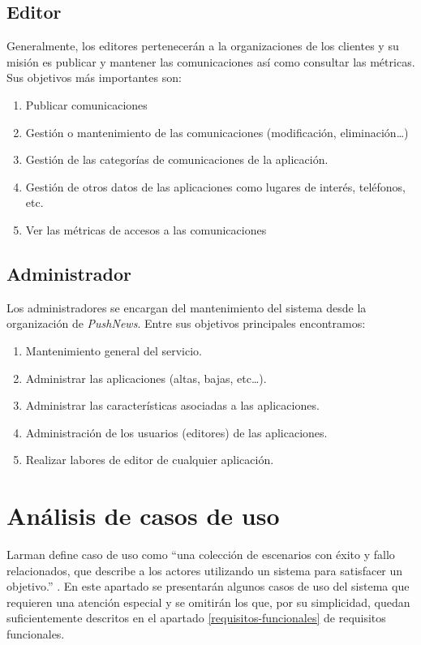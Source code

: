 \subsection{Editor}
Generalmente, los editores pertenecerán a la organizaciones de los clientes y su misión es publicar y mantener las comunicaciones así como consultar las métricas. Sus objetivos más importantes son:
\begin{enumerate}
    \item Publicar comunicaciones
    \item Gestión o mantenimiento de las comunicaciones (modificación, eliminación\dots)
    \item Gestión de las categorías de comunicaciones de la aplicación.
    \item Gestión de otros datos de las aplicaciones como lugares de interés, teléfonos, etc.
    \item Ver las métricas de accesos a las comunicaciones
\end{enumerate}

\subsection{Administrador}
Los administradores se encargan del mantenimiento del sistema desde la organización de \emph{PushNews}. Entre sus objetivos principales encontramos:
\begin{enumerate}
    \item Mantenimiento general del servicio.
    \item Administrar las aplicaciones (altas, bajas, etc\dots).
    \item Administrar las características asociadas a las aplicaciones.
    \item Administración de los usuarios (editores) de las aplicaciones. 
    \item Realizar labores de editor de cualquier aplicación.
\end{enumerate}

\section{Análisis de casos de uso}
Larman define caso de uso como ``una colección de escenarios con éxito y fallo relacionados, que describe a los actores utilizando un sistema para satisfacer un objetivo.'' \cite{Larman2004}. En este apartado se presentarán algunos casos de uso del sistema que requieren una atención especial y se omitirán los que, por su simplicidad, quedan suficientemente descritos en el apartado \ref{requisitos-funcionales} de requisitos funcionales.

